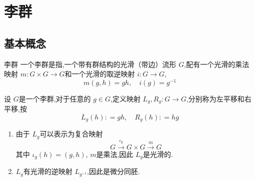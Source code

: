 \documentclass[../../几何与拓扑.tex]{subfiles}
\begin{document}
    

\chapter{李群} 

\section{基本概念}

\begin{definition}{李群}
    一个李群是指,一个带有群结构的光滑（带边）流形 \(  G  \),配有一个光滑的乘法映射 \(  m: G\times G \to G  \)和一个光滑的取逆映射 \(  i: G \to G  \), \[
    m\left( g,h \right)= gh,\quad  i\left( g \right)= g^{-1}   
    \]   
\end{definition}


\begin{definition}
    设 \(  G  \)是一个李群,对于任意的 \(   g \in G  \),定义映射 \(  L_{g},R_{g}: G\to G  \),分别称为左平移和右平移,按 \[
    L_{g}\left( h \right): =  gh,\quad  R_{g}\left( h \right): =  hg  
    \]   
\end{definition}
\begin{remark}
    \begin{enumerate}
        \item 由于 \(  L_{g}  \)可以表示为复合映射 \[
        G \xrightarrow{\iota _g }G\times G \xrightarrow{m} G
        \] 其中 \(  \iota _{g}\left( h \right)= \left( g,h \right)    \),  \(  m  \)是乘法,因此 \(  L_{g}  \)是光滑的.
        \item \(  L_{g}  \)有光滑的逆映射 \(  L_{g^{-1} }  \),因此是微分同胚.     
    \end{enumerate}
    
\end{remark}
\end{document}
